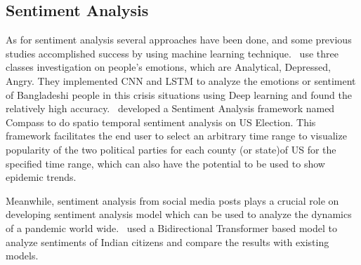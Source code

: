 \subsection{Sentiment Analysis}
As for sentiment analysis several approaches have been done, and some previous
studies accomplished success by using machine learning technique.~\cite
{pran2020analysis} use three classes investigation on people’s emotions,
which are Analytical, Depressed, Angry. They implemented CNN and LSTM to
analyze the emotions or sentiment of Bangladeshi people in this crisis
situations using Deep learning and found the relatively high accuracy.~\cite
{paul2017compass} developed a Sentiment Analysis framework named Compass to
do spatio temporal sentiment analysis on US Election. This framework
facilitates the end user to select an arbitrary time range to visualize
popularity of the two political parties for each county (or state)of US for
the specified time range, which can also have the potential to be used to
show epidemic trends.

Meanwhile, sentiment analysis from social media posts plays a crucial role on
developing sentiment analysis model which can be used to analyze the dynamics
of a pandemic world wide.~\cite{chintalapudi2021sentimental} used a
Bidirectional Transformer based model to analyze sentiments of Indian
citizens and compare the results with existing models.

